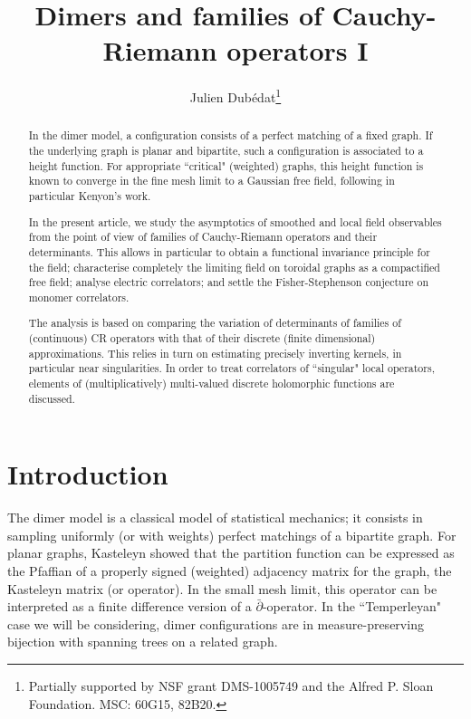 \documentclass[10pt]{article}
\title{Dimers and families of Cauchy-Riemann operators I}
\author{Julien Dub\'edat\footnote{Partially supported by NSF grant DMS-1005749 and the Alfred P. Sloan Foundation. MSC: 60G15, 82B20.}}
\newcommand{\dbar}{\bar\partial}
\begin{document}
\maketitle
\begin{abstract}
In the dimer model, a configuration consists of a perfect matching of a fixed graph. If the underlying graph is planar and bipartite, such a configuration is associated to a height function. For appropriate ``critical" (weighted) graphs, this height function is known to converge in the fine mesh limit to a Gaussian free field, following in particular Kenyon's work.
 
In the present article, we study the asymptotics of smoothed and local field observables from the point of view of families of Cauchy-Riemann operators and their determinants. This allows in particular to obtain a functional invariance principle for the field; characterise completely the limiting field on toroidal graphs as a compactified free field; analyse electric correlators; and settle the Fisher-Stephenson conjecture on monomer correlators.

The analysis is based on comparing the variation of determinants of families of (continuous) CR operators with that of their discrete (finite dimensional) approximations. This relies in turn on estimating precisely inverting kernels, in particular near singularities. In order to treat correlators of ``singular" local operators, elements of (multiplicatively) multi-valued discrete holomorphic functions are discussed.  

\end{abstract}

\tableofcontents

\section{Introduction}

The dimer model is a classical model of statistical mechanics; it consists in sampling uniformly (or with weights) perfect matchings of a bipartite graph. For planar graphs, Kasteleyn showed that the partition function can be expressed as the Pfaffian of a properly signed (weighted) adjacency matrix for the graph, the Kasteleyn matrix (or operator). In the small mesh limit, this operator can be interpreted as a finite difference version of a $\dbar$-operator. In the ``Temperleyan" case we will be considering, dimer configurations are in measure-preserving bijection with spanning trees on a related graph.
\end{document}
